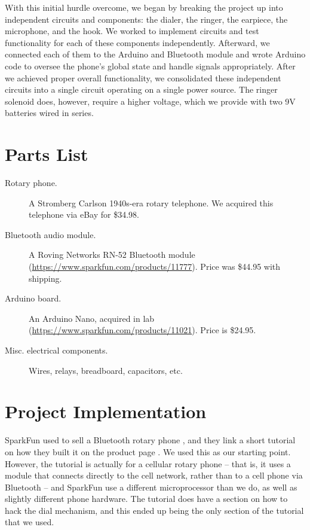 \documentclass{es50report}
\begin{document}
        With this initial hurdle overcome, we began by breaking the project up into independent circuits and components: the dialer, the ringer, the earpiece, the microphone, and the hook. We worked to implement circuits and test functionality for each of these components independently. Afterward, we connected each of them to the Arduino and Bluetooth module and wrote Arduino code to oversee the phone's global state and handle signals appropriately. After we achieved proper overall functionality, we consolidated these independent circuits into a single circuit operating on a single power source. The ringer solenoid does, however, require a higher voltage, which we provide with two 9V batteries wired in series.

    \section{Parts List}
        \begin{description}
            \item[Rotary phone.] A Stromberg Carlson 1940s-era rotary telephone. We acquired this telephone via eBay for \$34.98.
            \item[Bluetooth audio module.] A Roving Networks RN-52 Bluetooth module (\url{https://www.sparkfun.com/products/11777}). Price was \$44.95 with shipping.
            \item[Arduino board.] An Arduino Nano, acquired in lab (\url{https://www.sparkfun.com/products/11021}). Price is \$24.95.
            \item[Misc. electrical components.] Wires, relays, breadboard, capacitors, etc.
        \end{description}

    \section{Project Implementation}
    SparkFun used to sell a Bluetooth rotary phone \cite{sparkfun14}, and they link a short tutorial on how they built it on the product page \cite{seidle05}. We used this as our starting point. However, the tutorial is actually for a cellular rotary phone -- that is, it uses a module that connects directly to the cell network, rather than to a cell phone via Bluetooth -- and SparkFun use a different microprocessor than we do, as well as slightly different phone hardware. The tutorial does have a section on how to hack the dial mechanism, and this ended up being the only section of the tutorial that we used.
\end{document}
